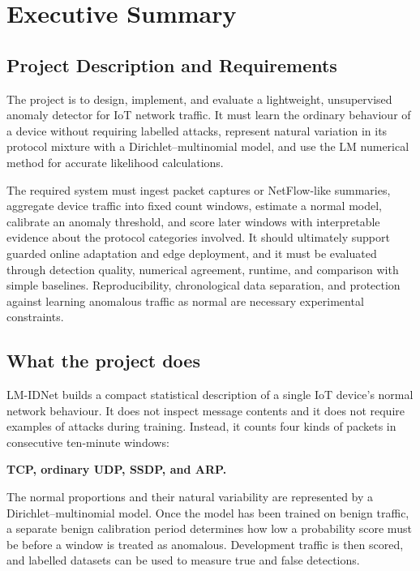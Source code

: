 \documentclass[11pt,a4paper]{article}
\newcommand{\projectname}{LM-IDNet}
\begin{document}
\newpage
\tableofcontents
\newpage

\section{Executive Summary}

\subsection{Project Description and Requirements}

The project is to design, implement, and evaluate a lightweight, unsupervised anomaly detector for IoT network traffic. It must learn the ordinary behaviour of a device without requiring labelled attacks, represent natural variation in its protocol mixture with a Dirichlet--multinomial model, and use the LM numerical method for accurate likelihood calculations.

The required system must ingest packet captures or NetFlow-like summaries, aggregate device traffic into fixed count windows, estimate a normal model, calibrate an anomaly threshold, and score later windows with interpretable evidence about the protocol categories involved. It should ultimately support guarded online adaptation and edge deployment, and it must be evaluated through detection quality, numerical agreement, runtime, and comparison with simple baselines. Reproducibility, chronological data separation, and protection against learning anomalous traffic as normal are necessary experimental constraints.

\subsection{What the project does}

\projectname{} builds a compact statistical description of a single IoT device's normal network behaviour. It does not inspect message contents and it does not require examples of attacks during training. Instead, it counts four kinds of packets in consecutive ten-minute windows:

\begin{center}
\textbf{TCP, ordinary UDP, SSDP, and ARP.}
\end{center}

The normal proportions and their natural variability are represented by a Dirichlet--multinomial model. Once the model has been trained on benign traffic, a separate benign calibration period determines how low a probability score must be before a window is treated as anomalous. Development traffic is then scored, and labelled datasets can be used to measure true and false detections.
\end{document}
